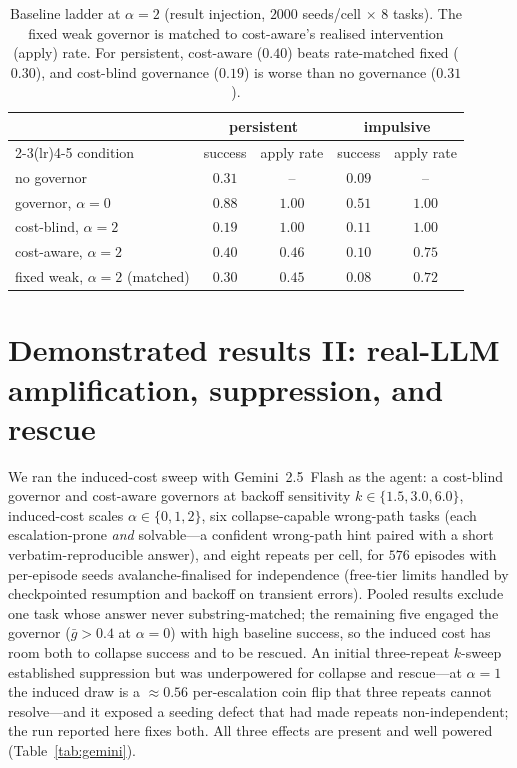 \documentclass[11pt]{article}
\newcommand{\poweredEpisodes}{576}
\begin{document}
\begin{table}[t]
\centering
\caption{Baseline ladder at $\alpha=2$ (result injection, $2000$ seeds/cell
$\times$ $8$ tasks). The fixed weak governor is matched to cost-aware's realised
intervention (apply) rate. For persistent, cost-aware ($0.40$) beats
rate-matched fixed ($0.30$), and cost-blind governance ($0.19$) is worse than no
governance ($0.31$).}
\label{tab:baselines}
\begin{tabular}{lcccc}
\toprule
 & \multicolumn{2}{c}{persistent} & \multicolumn{2}{c}{impulsive} \\
\cmidrule(lr){2-3}\cmidrule(lr){4-5}
condition & success & apply rate & success & apply rate \\
\midrule
no governor                 & $0.31$ & --     & $0.09$ & -- \\
governor, $\alpha{=}0$       & $0.88$ & $1.00$ & $0.51$ & $1.00$ \\
cost-blind, $\alpha{=}2$     & $0.19$ & $1.00$ & $0.11$ & $1.00$ \\
cost-aware, $\alpha{=}2$     & $\mathbf{0.40}$ & $0.46$ & $0.10$ & $0.75$ \\
fixed weak, $\alpha{=}2$ (matched) & $0.30$ & $0.45$ & $0.08$ & $0.72$ \\
\bottomrule
\end{tabular}
\end{table}

\section{Demonstrated results II: real-LLM amplification, suppression, and rescue}
\label{sec:gemini}

We ran the induced-cost sweep with Gemini~2.5~Flash as the agent: a cost-blind
governor and cost-aware governors at backoff sensitivity $k\in\{1.5,3.0,6.0\}$,
induced-cost scales $\alpha\in\{0,1,2\}$, six collapse-capable wrong-path tasks (each escalation-prone \emph{and} solvable---a
confident wrong-path hint paired with a short verbatim-reproducible answer), and
eight repeats per cell, for $\poweredEpisodes$ episodes with per-episode seeds
avalanche-finalised for independence (free-tier limits handled by checkpointed
resumption and backoff on transient errors). Pooled results exclude one task
whose answer never substring-matched; the remaining five engaged the governor
($\bar g>0.4$ at $\alpha=0$) with high baseline success, so the induced cost has
room both to collapse success and to be rescued. An initial three-repeat
$k$-sweep established suppression but was underpowered for collapse and
rescue---at $\alpha=1$ the induced draw is a ${\approx}0.56$ per-escalation coin
flip that three repeats cannot resolve---and it exposed a seeding defect that
had made repeats non-independent; the run reported here fixes both. All three
effects are present and well powered (Table~\ref{tab:gemini}).
\end{document}
